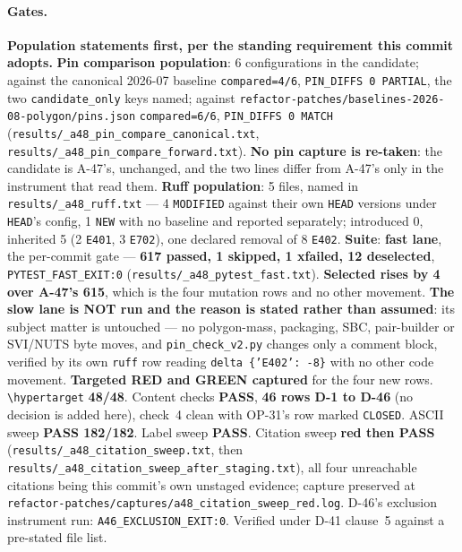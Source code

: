 \documentclass[
  10pt,
]{article}
\begin{document}
\paragraph{Gates.}
\textbf{Population statements first, per the standing requirement this commit adopts.} \textbf{Pin comparison population}: 6 configurations in the candidate; against the canonical 2026-07 baseline \texttt{compared=4/6}, \texttt{PIN\_DIFFS 0 PARTIAL}, the two \texttt{candidate\_only} keys named; against \texttt{refactor-patches/\allowbreak{}baselines-2026-08-polygon/\allowbreak{}pins.json} \texttt{compared=6/6}, \texttt{PIN\_DIFFS 0 MATCH} (\texttt{results/\allowbreak{}\_a48\_pin\_compare\_canonical.txt}, \texttt{results/\allowbreak{}\_a48\_pin\_compare\_forward.txt}). \textbf{No pin capture is re-taken}: the candidate is A-47's, unchanged, and the two lines differ from A-47's only in the instrument that read them. \textbf{Ruff population}: 5 files, named in \texttt{results/\allowbreak{}\_a48\_ruff.txt} --- 4 \texttt{MODIFIED} against their own \texttt{HEAD} versions under \texttt{HEAD}'s config, 1 \texttt{NEW} with no baseline and reported separately; introduced 0, inherited 5 (2 \texttt{E401}, 3 \texttt{E702}), one declared removal of 8 \texttt{E402}. \textbf{Suite}: \textbf{fast lane}, the per-commit gate --- \textbf{617 passed, 1 skipped, 1 xfailed, 12 deselected}, \texttt{PYTEST\_FAST\_EXIT:0} (\texttt{results/\allowbreak{}\_a48\_pytest\_fast.txt}). \textbf{Selected rises by 4 over A-47's 615}, which is the four mutation rows and no other movement. \textbf{The slow lane is NOT run and the reason is stated rather than assumed}: its subject matter is untouched --- no polygon-mass, packaging, SBC, pair-builder or SVI/NUTS byte moves, and \texttt{pin\_check\_v2.py} changes only a comment block, verified by its own \texttt{ruff} row reading \texttt{delta \{'E402': -8\}} with no other code movement. \textbf{Targeted RED and GREEN captured} for the four new rows. \texttt{\textbackslash hypertarget} \textbf{48/48}. Content checks \textbf{PASS}, \textbf{46 rows D-1 to D-46} (no decision is added here), check~4 clean with OP-31's row marked \texttt{CLOSED}. ASCII sweep \textbf{PASS 182/182}. Label sweep \textbf{PASS}. Citation sweep \textbf{red then PASS} (\texttt{results/\allowbreak{}\_a48\_citation\_sweep.txt}, then \texttt{results/\allowbreak{}\_a48\_citation\_sweep\_after\_staging.txt}), all four unreachable citations being this commit's own unstaged evidence; capture preserved at \texttt{refactor-patches/\allowbreak{}captures/\allowbreak{}a48\_citation\_sweep\_red.log}. D-46's exclusion instrument run: \texttt{A46\_EXCLUSION\_EXIT:0}. Verified under D-41 clause~5 against a pre-stated file list.
\end{document}
